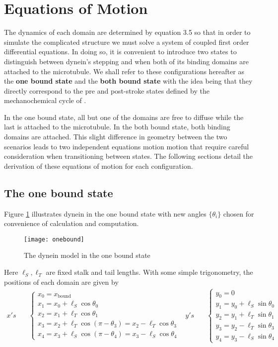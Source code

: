 	\section{Equations of Motion}
	The dynamics of each domain are determined by equation 3.5 so that in order to simulate the complicated structure we must solve a system of coupled first order differential equations. In doing so, it is convenient to introduce two states to distinguish between dynein's stepping and when both of its binding domains are attached to the microtubule. We shall refer to these configurations hereafter as the \textbf{one bound state} and the \textbf{both bound state} with the idea being that they directly correspond to the pre and post-stroke states defined by the mechanochemical cycle of \cite{cianfrocco2015mechanism}.  
	
	In the one bound state, all but one of the domains are free to diffuse while the last is attached to the microtubule. In the both bound state, both binding domains are attached. This slight difference in geometry between the two scenarios leads to two independent equations motion motion that require careful consideration when transitioning between states. The following sections detail the derivation of these equations of motion for each configuration. 
	
		\subsection{The one bound state}
		Figure \ref{fig:one bound} illustrates dynein in the one bound state with new angles $\{\theta_i\}$ chosen for convenience of calculation and computation.\\
		\begin{figure}[!hbt]
			\centering
			\texttt{[image: onebound]}
			\caption[One bound angles]{The dynein model in the one bound state }
			\label{fig:one bound}  
		\end{figure}
		
		\noindent Here $\ell_S, \ell_T$ are fixed stalk and tail lengths. With some simple trigonometry, the positions of each domain are given by
		\begin{align}
		x's \quad &\begin{cases}
		x_0 = x_\text{bound} \\
		x_1 = x_0 + \ell_S \cos\theta_0 \\
		x_2 = x_1 + \ell_T \cos\theta_1 \\
		x_3 = x_2 + \ell_T \cos(\pi-\theta_3) = x_2 - \ell_T\cos\theta_3 \\
		x_4 = x_3 + \ell_S \cos(\pi-\theta_4) = x_3 - \ell_S\cos\theta_4
		\end{cases} &
		y's \quad &\begin{cases}
		y_0 = 0 \\
		y_1 = y_0 + \ell_S\sin\theta_0 \\
		y_2 = y_1 + \ell_T\sin\theta_1 \\
		y_3 = y_2 - \ell_T\sin\theta_3 \\
		y_4 = y_3 - \ell_S\sin\theta_4 
		\end{cases}
		\end{align} 
		

